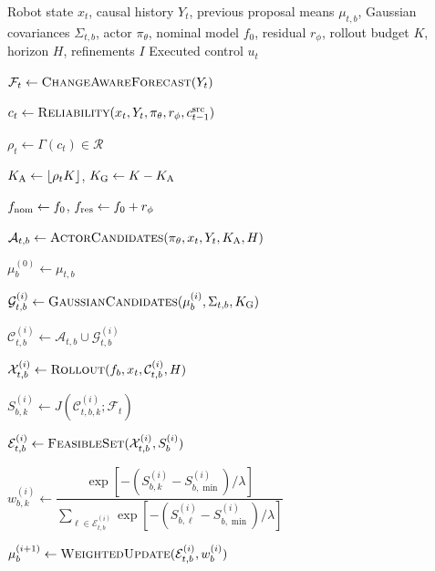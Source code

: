 \documentclass[conference]{IEEEtran}
\begin{document}
\begin{algorithm}[!t]
\caption{One Online Control Cycle of LAR-MPPI}
\label{alg:lar_mppi}
\footnotesize
\begin{algorithmic}[1]

\REQUIRE Robot state $x_t$, causal history $Y_t$, previous proposal means
$\mu_{t,b}$, Gaussian covariances $\Sigma_{t,b}$, actor $\pi_\theta$, nominal model $f_0$,
residual $r_\phi$, rollout budget $K$, horizon $H$, refinements $I$
\ENSURE Executed control $u_t$

\STATE $\mathcal{F}_t \leftarrow
\textsc{ChangeAwareForecast}(Y_t)$

\STATE $c_t \leftarrow
\textsc{Reliability}(x_t,Y_t,\pi_\theta,r_\phi,c_{t-1}^{\rm src})$

\STATE $\rho_t\leftarrow\Gamma(c_t)\in\mathcal{R}$

\STATE $K_{\rm A}\leftarrow\lfloor\rho_tK\rfloor$,
$K_{\rm G}\leftarrow K-K_{\rm A}$

\STATE $f_{\rm nom}\leftarrow f_0$,
$f_{\rm res}\leftarrow f_0+r_\phi$


    \STATE $\mathcal{A}_{t,b}\leftarrow
    \textsc{ActorCandidates}
    (\pi_\theta,x_t,Y_t,K_{\rm A},H)$

    \STATE $\mu_b^{(0)}\leftarrow\mu_{t,b}$


        \STATE $\mathcal{G}_{t,b}^{(i)}\leftarrow
        \textsc{GaussianCandidates}
        (\mu_b^{(i)},\Sigma_{t,b},K_{\rm G})$

        \STATE $\mathcal{C}_{t,b}^{(i)}\leftarrow
        \mathcal{A}_{t,b}\cup\mathcal{G}_{t,b}^{(i)}$

        \STATE $\mathcal{X}_{t,b}^{(i)}\leftarrow
        \textsc{Rollout}
        (f_b,x_t,\mathcal{C}_{t,b}^{(i)},H)$

        \STATE $S_{b,k}^{(i)}\leftarrow
        J(\mathcal{C}_{t,b,k}^{(i)};\mathcal{F}_t)$

        \STATE $\mathcal{E}_{t,b}^{(i)}\leftarrow
        \textsc{FeasibleSet}
        (\mathcal{X}_{t,b}^{(i)},S_b^{(i)})$

        \STATE $w_{b,k}^{(i)}\leftarrow
        \dfrac{
        \exp[-(S_{b,k}^{(i)}-S_{b,\min}^{(i)})/\lambda]}
        {\sum_{\ell\in\mathcal{E}_{t,b}^{(i)}}
        \exp[-(S_{b,\ell}^{(i)}-S_{b,\min}^{(i)})/\lambda]}$

        \STATE $\mu_b^{(i+1)}\leftarrow
        \textsc{WeightedUpdate}
        (\mathcal{E}_{t,b}^{(i)},w_b^{(i)})$


\end{algorithmic}
\end{algorithm}
\end{document}
